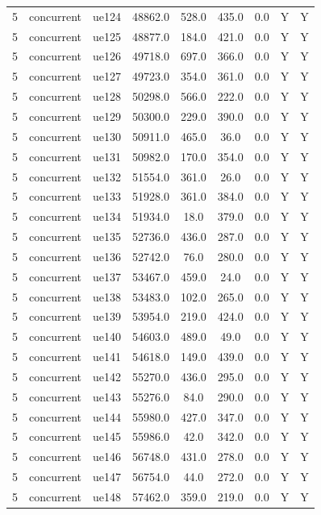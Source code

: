 \begin{table}[ht]
\begin{tabular}{|c|c|c|c|c|c|c|c|c|}
5 & concurrent & ue124 & 48862.0 & 528.0 & 435.0 & 0.0 & Y & Y \\
5 & concurrent & ue125 & 48877.0 & 184.0 & 421.0 & 0.0 & Y & Y \\
5 & concurrent & ue126 & 49718.0 & 697.0 & 366.0 & 0.0 & Y & Y \\
5 & concurrent & ue127 & 49723.0 & 354.0 & 361.0 & 0.0 & Y & Y \\
5 & concurrent & ue128 & 50298.0 & 566.0 & 222.0 & 0.0 & Y & Y \\
5 & concurrent & ue129 & 50300.0 & 229.0 & 390.0 & 0.0 & Y & Y \\
5 & concurrent & ue130 & 50911.0 & 465.0 & 36.0 & 0.0 & Y & Y \\
5 & concurrent & ue131 & 50982.0 & 170.0 & 354.0 & 0.0 & Y & Y \\
5 & concurrent & ue132 & 51554.0 & 361.0 & 26.0 & 0.0 & Y & Y \\
5 & concurrent & ue133 & 51928.0 & 361.0 & 384.0 & 0.0 & Y & Y \\
5 & concurrent & ue134 & 51934.0 & 18.0 & 379.0 & 0.0 & Y & Y \\
5 & concurrent & ue135 & 52736.0 & 436.0 & 287.0 & 0.0 & Y & Y \\
5 & concurrent & ue136 & 52742.0 & 76.0 & 280.0 & 0.0 & Y & Y \\
5 & concurrent & ue137 & 53467.0 & 459.0 & 24.0 & 0.0 & Y & Y \\
5 & concurrent & ue138 & 53483.0 & 102.0 & 265.0 & 0.0 & Y & Y \\
5 & concurrent & ue139 & 53954.0 & 219.0 & 424.0 & 0.0 & Y & Y \\
5 & concurrent & ue140 & 54603.0 & 489.0 & 49.0 & 0.0 & Y & Y \\
5 & concurrent & ue141 & 54618.0 & 149.0 & 439.0 & 0.0 & Y & Y \\
5 & concurrent & ue142 & 55270.0 & 436.0 & 295.0 & 0.0 & Y & Y \\
5 & concurrent & ue143 & 55276.0 & 84.0 & 290.0 & 0.0 & Y & Y \\
5 & concurrent & ue144 & 55980.0 & 427.0 & 347.0 & 0.0 & Y & Y \\
5 & concurrent & ue145 & 55986.0 & 42.0 & 342.0 & 0.0 & Y & Y \\
5 & concurrent & ue146 & 56748.0 & 431.0 & 278.0 & 0.0 & Y & Y \\
5 & concurrent & ue147 & 56754.0 & 44.0 & 272.0 & 0.0 & Y & Y \\
5 & concurrent & ue148 & 57462.0 & 359.0 & 219.0 & 0.0 & Y & Y \\

\end{tabular}
\end{table}
